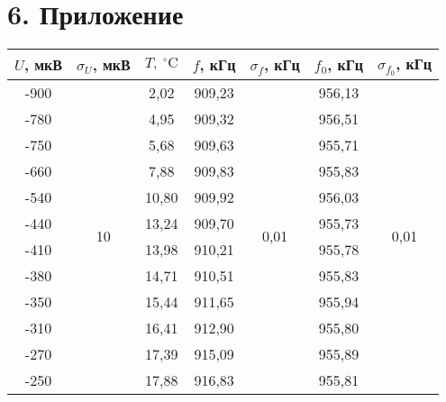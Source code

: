 \documentclass[a4paper,12pt]{report}
\begin{document}
\section*{6. Приложение}
\begin{table}[H]
\begin{tabular}{|c|c|c|c|c|c|c|}
\hline
$U$, мкВ & $\sigma_{U}$, мкВ         & $T,~^\circ \text{C}$     & $f$, кГц & $\sigma_{f}$, кГц           & $f_{0}$, кГц & $\sigma_{f_{0}}$, кГц          \\ \hline
-900   & \multirow{23}{*}{10} & 2,02  & 909,23 & \multirow{23}{*}{0,01} & 956,13  & \multirow{23}{*}{0,01} \\ \cline{1-1} \cline{3-4} \cline{6-6}
-780   &                      & 4,95  & 909,32 &                        & 956,51  &                        \\ \cline{1-1} \cline{3-4} \cline{6-6}
-750   &                      & 5,68  & 909,63 &                        & 955,71  &                        \\ \cline{1-1} \cline{3-4} \cline{6-6}
-660   &                      & 7,88  & 909,83 &                        & 955,83  &                        \\ \cline{1-1} \cline{3-4} \cline{6-6}
-540   &                      & 10,80 & 909,92 &                        & 956,03  &                        \\ \cline{1-1} \cline{3-4} \cline{6-6}
-440   &                      & 13,24 & 909,70 &                        & 955,73  &                        \\ \cline{1-1} \cline{3-4} \cline{6-6}
-410   &                      & 13,98 & 910,21 &                        & 955,78  &                        \\ \cline{1-1} \cline{3-4} \cline{6-6}
-380   &                      & 14,71 & 910,51 &                        & 955,83  &                        \\ \cline{1-1} \cline{3-4} \cline{6-6}
-350   &                      & 15,44 & 911,65 &                        & 955,94  &                        \\ \cline{1-1} \cline{3-4} \cline{6-6}
-310   &                      & 16,41 & 912,90 &                        & 955,80  &                        \\ \cline{1-1} \cline{3-4} \cline{6-6}
-270   &                      & 17,39 & 915,09 &                        & 955,89  &                        \\ \cline{1-1} \cline{3-4} \cline{6-6}
-250   &                      & 17,88 & 916,83 &                        & 955,81  &                        \\ \cline{1-1} \cline{3-4} \cline{6-6}

\end{tabular}
\end{table}
\end{document}
